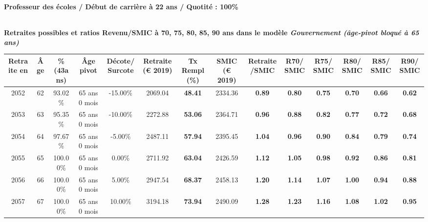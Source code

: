 {\bf \noindent Professeur des écoles / Début de carrière à 22 ans / Quotité : 100\%}  ~ 

 ~\\{\bf \noindent Retraites possibles et ratios Revenu/SMIC à 70, 75, 80, 85, 90 ans dans le modèle \emph{Gouvernement (âge-pivot bloqué à 65 ans)}}  
 
\begin{adjustbox}{max width=\textwidth} 
\begin{tabular}[htb]{|c|c||c|c|c||c|c||c|c||c|c|c|c|c|} 
\hline 
 Retraite en &  Âge &  \%(43ans) &  Âge pivot &  Décote/Surcote &  Retraite (\euro{} 2019) &  Tx Rempl(\%) &  SMIC (\euro{} 2019) &  Retraite/SMIC &  R70/SMIC &  R75/SMIC &  R80/SMIC &  R85/SMIC &  R90/SMIC \\ 
\hline \hline 
 2052 &  62 &  93.02\% &  65 ans 0 mois &  -15.00\% &  2069.04 &  {\bf 48.41} &  2334.36 &  {\bf {\color{red} 0.89}} &  {\bf {\color{red} 0.80}} &  {\bf {\color{red} 0.75}} &  {\bf {\color{red} 0.70}} &  {\bf {\color{red} 0.66}} &  {\bf {\color{red} 0.62}} \\ 
\hline 
 2053 &  63 &  95.35\% &  65 ans 0 mois &  -10.00\% &  2272.88 &  {\bf 53.06} &  2364.71 &  {\bf {\color{red} 0.96}} &  {\bf {\color{red} 0.88}} &  {\bf {\color{red} 0.82}} &  {\bf {\color{red} 0.77}} &  {\bf {\color{red} 0.72}} &  {\bf {\color{red} 0.68}} \\ 
\hline 
 2054 &  64 &  97.67\% &  65 ans 0 mois &  -5.00\% &  2487.11 &  {\bf 57.94} &  2395.45 &  {\bf 1.04} &  {\bf {\color{red} 0.96}} &  {\bf {\color{red} 0.90}} &  {\bf {\color{red} 0.84}} &  {\bf {\color{red} 0.79}} &  {\bf {\color{red} 0.74}} \\ 
\hline 
 2055 &  65 &  100.00\% &  65 ans 0 mois &  0.00\% &  2711.92 &  {\bf 63.04} &  2426.59 &  {\bf 1.12} &  {\bf 1.05} &  {\bf {\color{red} 0.98}} &  {\bf {\color{red} 0.92}} &  {\bf {\color{red} 0.86}} &  {\bf {\color{red} 0.81}} \\ 
\hline 
 2056 &  66 &  100.00\% &  65 ans 0 mois &  5.00\% &  2947.54 &  {\bf 68.37} &  2458.13 &  {\bf 1.20} &  {\bf 1.14} &  {\bf 1.07} &  {\bf 1.00} &  {\bf {\color{red} 0.94}} &  {\bf {\color{red} 0.88}} \\ 
\hline 
 2057 &  67 &  100.00\% &  65 ans 0 mois &  10.00\% &  3194.18 &  {\bf 73.94} &  2490.09 &  {\bf 1.28} &  {\bf 1.23} &  {\bf 1.16} &  {\bf 1.08} &  {\bf 1.02} &  {\bf {\color{red} 0.95}} \\ 
\hline 
\hline 
\end{tabular} 
\end{adjustbox} 
 
